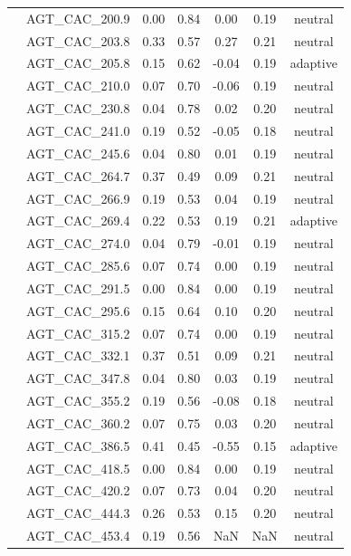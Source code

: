 \documentclass[11pt,]{article}
\begin{document}
\begin{longtable}[c]{@{}lcccccc@{}}
& AGT\_CAC\_200.9 & 0.00 & 0.84 & 0.00 & 0.19 & neutral
\\\addlinespace
& AGT\_CAC\_203.8 & 0.33 & 0.57 & 0.27 & 0.21 & neutral
\\\addlinespace
& AGT\_CAC\_205.8 & 0.15 & 0.62 & -0.04 & 0.19 & adaptive
\\\addlinespace
& AGT\_CAC\_210.0 & 0.07 & 0.70 & -0.06 & 0.19 & neutral
\\\addlinespace
& AGT\_CAC\_230.8 & 0.04 & 0.78 & 0.02 & 0.20 & neutral
\\\addlinespace
& AGT\_CAC\_241.0 & 0.19 & 0.52 & -0.05 & 0.18 & neutral
\\\addlinespace
& AGT\_CAC\_245.6 & 0.04 & 0.80 & 0.01 & 0.19 & neutral
\\\addlinespace
& AGT\_CAC\_264.7 & 0.37 & 0.49 & 0.09 & 0.21 & neutral
\\\addlinespace
& AGT\_CAC\_266.9 & 0.19 & 0.53 & 0.04 & 0.19 & neutral
\\\addlinespace
& AGT\_CAC\_269.4 & 0.22 & 0.53 & 0.19 & 0.21 & adaptive
\\\addlinespace
& AGT\_CAC\_274.0 & 0.04 & 0.79 & -0.01 & 0.19 & neutral
\\\addlinespace
& AGT\_CAC\_285.6 & 0.07 & 0.74 & 0.00 & 0.19 & neutral
\\\addlinespace
& AGT\_CAC\_291.5 & 0.00 & 0.84 & 0.00 & 0.19 & neutral
\\\addlinespace
& AGT\_CAC\_295.6 & 0.15 & 0.64 & 0.10 & 0.20 & neutral
\\\addlinespace
& AGT\_CAC\_315.2 & 0.07 & 0.74 & 0.00 & 0.19 & neutral
\\\addlinespace
& AGT\_CAC\_332.1 & 0.37 & 0.51 & 0.09 & 0.21 & neutral
\\\addlinespace
& AGT\_CAC\_347.8 & 0.04 & 0.80 & 0.03 & 0.19 & neutral
\\\addlinespace
& AGT\_CAC\_355.2 & 0.19 & 0.56 & -0.08 & 0.18 & neutral
\\\addlinespace
& AGT\_CAC\_360.2 & 0.07 & 0.75 & 0.03 & 0.20 & neutral
\\\addlinespace
& AGT\_CAC\_386.5 & 0.41 & 0.45 & -0.55 & 0.15 & adaptive
\\\addlinespace
& AGT\_CAC\_418.5 & 0.00 & 0.84 & 0.00 & 0.19 & neutral
\\\addlinespace
& AGT\_CAC\_420.2 & 0.07 & 0.73 & 0.04 & 0.20 & neutral
\\\addlinespace
& AGT\_CAC\_444.3 & 0.26 & 0.53 & 0.15 & 0.20 & neutral
\\\addlinespace
& AGT\_CAC\_453.4 & 0.19 & 0.56 & NaN & NaN & neutral

\end{longtable}
\end{document}
